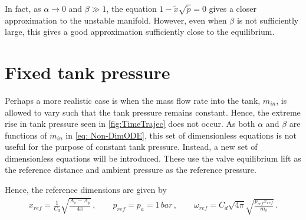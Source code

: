 In fact, as $\alpha \rightarrow 0$ and $\beta \gg 1$, the equation $1 - \tilde{x} \sqrt{\tilde{p}} = 0$ gives a closer approximation to the unstable manifold. However, even when $\beta$ is not sufficiently large, this gives a good approximation sufficiently close to the equilibrium.

% 

\section{Fixed tank pressure} \label{sec: ClosingFixPres}

Perhaps a more realistic case is when the mass flow rate into the tank, $\dot{m}_{in}$, is allowed to vary such that the tank pressure remains constant. Hence, the extreme rise in tank pressure seen in \cref{fig:TimeTrajec} does not occur. As both $\alpha$ and $\beta$ are functions of $\dot{m}_{in}$ in \cref{eq: Non-DimODE}, this set of dimensionless equations is not useful for the purpose of constant tank pressure. Instead, a new set of dimensionless equations will be introduced. These use the valve equilibrium lift as the reference distance and ambient pressure as the reference pressure.

Hence, the reference dimensions are given by
~
\begin{equation*}
\begin{split}
    x_{ref} = \frac{1}{C_d} \sqrt{\frac{A_v - A_p}{4 \pi}}
    \, , \qquad
    p_{ref} = p_a = 1 \, \si{bar}
    \, , \qquad
    \omega_{ref} = C_d \sqrt{4 \pi} \sqrt{\frac{p_{ref} x_{ref}}{m_v}} \, .
\end{split}
\end{equation*}

